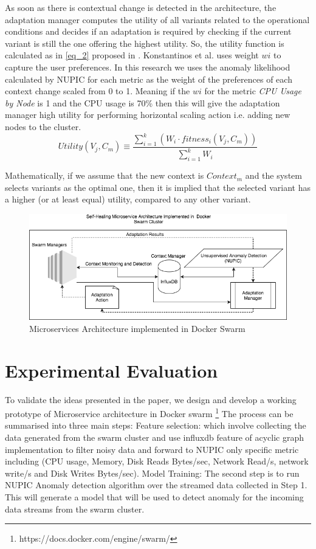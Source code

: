 \documentclass[sigconf]{acmart}
\begin{document}
As soon as there is contextual change is detected in the architecture, the adaptation manager computes the utility of all variants related to the operational conditions and decides if an adaptation is required by checking if the current variant is still the one offering the highest utility. So, the utility function is calculated as in \ref{eq_2} proposed in \cite{KonstantinosKakousis:2008ub}. Konstantinos et al. uses weight $wi$ to capture the user preferences. In this research we uses the anomaly likelihood calculated by NUPIC for each metric as the weight of the preferences of each context change scaled from 0 to 1. Meaning if the $wi$ for the metric \textit{CPU Usage by Node} is 1 and the CPU usage is 70\% then this will give the adaptation manager high utility for performing horizontal scaling action i.e. adding new nodes to the cluster. 
\begin{equation}
\label{eq_2}
    Utility(V_{j},C_{m}) \equiv \frac{ \sum_{i=1}^{k} (W_{i} \cdot fitness_{i}(V_{j},C_{m}) ) }{\sum_{i=1}^{k} W_{i} }
\end{equation}


Mathematically, if we assume that the new context is $Context_{m}$  and the system selects variants as the optimal one, then it is implied that the selected variant has a higher (or at least equal) utility, compared to any other variant.  
 
\begin{figure}[ht] 
\includegraphics[scale=0.35]{implementation}
\caption{Microservices Architecture implemented in Docker Swarm}
\label{fig_imp}
\end{figure}
\section{Experimental Evaluation}

To validate the ideas presented in the paper, we design and develop a working prototype of Microservice architecture in Docker swarm \footnote{https://docs.docker.com/engine/swarm/} 
The process can be summarised into three main steps: 
Feature selection: which involve collecting the data generated from the swarm cluster and use influxdb feature of acyclic graph implementation to filter noisy data and forward to NUPIC only specific metric including (CPU usage, Memory, Disk Reads Bytes/sec, Network Read/s, network write/s and Disk Writes Bytes/sec). 
Model Training: The second step is to run NUPIC Anomaly detection algorithm over the streamed data collected in Step 1. This will generate a model that will be used to detect anomaly for the incoming data streams from the swarm cluster. 
\end{document}
